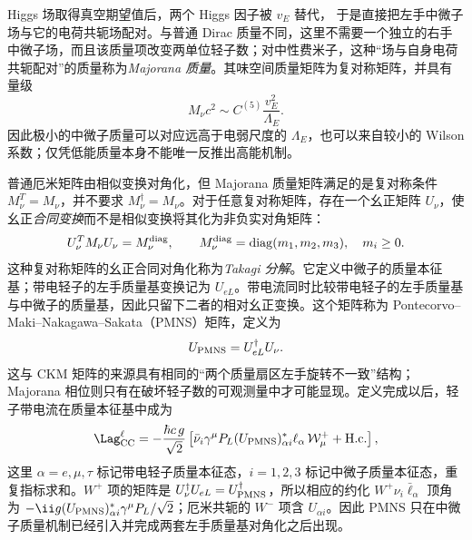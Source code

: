 Higgs 场取得真空期望值后，两个 Higgs 因子被 $v_E$ 替代， 于是直接把左手中微子场与它的电荷共轭场配对。与普通 Dirac 质量不同，这里不需要一个独立的右手中微子场，而且该质量项改变两单位轻子数；对中性费米子，这种“场与自身电荷共轭配对”的质量称为\emph{Majorana 质量}。其味空间质量矩阵为复对称矩阵，并具有量级
\begin{equation}
{
M_\nu c^2\sim C^{(5)}\frac{v_E^2}{\Lambda_E}.}
\label{eq:neutrino-mass-weinberg-dp11}
\end{equation}
因此极小的中微子质量可以对应远高于电弱尺度的 $\Lambda_E$，也可以来自较小的 Wilson 系数；仅凭低能质量本身不能唯一反推出高能机制。

普通厄米矩阵由相似变换对角化，但 Majorana 质量矩阵满足的是复对称条件 $M_\nu^T=M_\nu$，并不要求 $M_\nu^\dagger=M_\nu$。对于任意复对称矩阵，存在一个幺正矩阵 $U_\nu$，使幺正\emph{合同变换}而不是相似变换将其化为非负实对角矩阵：
\begin{equation*}
U_\nu^TM_\nu U_\nu=M_\nu^{\rm diag},
\qquad M_\nu^{\rm diag}=\operatorname{diag}(m_1,m_2,m_3),\quad m_i\ge0.
\end{equation*}
这种复对称矩阵的幺正合同对角化称为\emph{Takagi 分解}。它定义中微子的质量本征基；带电轻子的左手质量基变换记为 $U_{eL}$。带电流同时比较带电轻子的左手质量基与中微子的质量基，因此只留下二者的相对幺正变换。这个矩阵称为 Pontecorvo--Maki--Nakagawa--Sakata（PMNS）矩阵，定义为
\begin{equation}
{U_{\rm PMNS}=U_{eL}^\dagger U_\nu.}
\label{eq:pmns-definition-dp11}
\end{equation}
这与 CKM 矩阵的来源具有相同的“两个质量扇区左手旋转不一致”结构；Majorana 相位则只有在破坏轻子数的可观测量中才可能显现。定义完成以后，轻子带电流在质量本征基中成为
\begin{equation}
{
 \Lag_{\rm CC}^{\ell}
 =-\frac{\hbar c\,g}{\sqrt2}
 \left[\bar\nu_i\gamma^\mu P_L(U_{\rm PMNS})_{\alpha i}^*\ell_\alpha\,\mathcal W_\mu^+
 +\mathrm{H.c.}\right],}
\label{eq:pmns-charged-current-dp43}
\end{equation}
这里 $\alpha=e,\mu,\tau$ 标记带电轻子质量本征态，$i=1,2,3$ 标记中微子质量本征态，重复指标求和。$W^+$ 项的矩阵是 $U_\nu^\dagger U_{eL}=U_{\rm PMNS}^\dagger$，所以相应的约化 $W^+\nu_i\bar\ell_\alpha$ 顶角为 $-\ii g(U_{\rm PMNS})_{\alpha i}^*\gamma^\mu P_L/\sqrt2$；厄米共轭的 $W^-$ 项含 $U_{\alpha i}$。因此 PMNS 只在中微子质量机制已经引入并完成两套左手质量基对角化之后出现。

